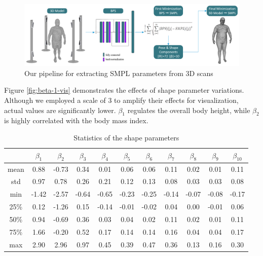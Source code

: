 \begin{figure}[H]
    \centering
    \includegraphics[width=\textwidth]{files/pipeline_smpl.png}
    \caption{Our pipeline for extracting SMPL parameters from 3D scans}
\end{figure}

Figure \ref{fig:beta-1-vis} demonstrates the effects of shape parameter
variations. Although we employed a scale of 3 to amplify their effects for
visualization, actual values are significantly lower. $\beta_1$ regulates the
overall body height, while $\beta_2$ is highly correlated with the body mass
index.

\begin{table}[h]
    \centering
    \begin{tabular}{c | c c c c c c c c c c}
        \toprule
             & $\beta_1$ & $\beta_2$ & $\beta_3$ & $\beta_4$ & $\beta_5$ & $\beta_6$ & $\beta_7$ & $\beta_8$ & $\beta_9$ & $\beta_{10}$ \\
        \midrule
        mean & 0.88      & -0.73     & 0.34      & 0.01      & 0.06      & 0.06      & 0.11      & 0.02      & 0.01      & 0.11         \\

        std  & 0.97      & 0.78      & 0.26      & 0.21      & 0.12      & 0.13      & 0.08      & 0.03      & 0.03      & 0.08         \\

        min  & -1.42     & -2.57     & -0.64     & -0.65     & -0.23     & -0.25     & -0.14     & -0.07     & -0.08     &
        -0.17                                                                                                                           \\

        25\% & 0.12      & -1.26     & 0.15      & -0.14     & -0.01     & -0.02     & 0.04      & 0.00      & -0.01     & 0.06         \\

        50\% & 0.94      & -0.69     & 0.36      & 0.03      & 0.04      & 0.02      & 0.11      & 0.02      & 0.01      & 0.11         \\

        75\% & 1.66      & -0.20     & 0.52      & 0.17      & 0.14      & 0.14      & 0.16      & 0.04      & 0.04      & 0.17         \\

        max  & 2.90      & 2.96      & 0.97      & 0.45      & 0.39      & 0.47      & 0.36      & 0.13      & 0.16      & 0.30         \\
        \bottomrule
    \end{tabular}
    \caption{Statistics of the shape parameters}
\end{table}

